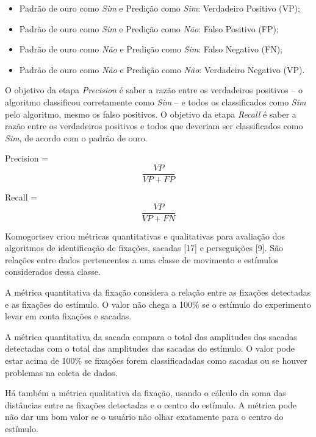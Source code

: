 \documentclass[brazil,]{report}
\begin{document}
\begin{itemize}
\itemsep1pt\parskip0pt
\item
  Padrão de ouro como \emph{Sim} e Predição como \emph{Sim}: Verdadeiro
  Positivo (VP);
\item
  Padrão de ouro como \emph{Sim} e Predição como \emph{Não}: Falso
  Positivo (FP);
\item
  Padrão de ouro como \emph{Não} e Predição como \emph{Sim}: Falso
  Negativo (FN);
\item
  Padrão de ouro como \emph{Não} e Predição como \emph{Não}: Verdadeiro
  Negativo (VP).
\end{itemize}

O objetivo da etapa \emph{Precision} é saber a razão entre os
verdadeiros positivos -- o algoritmo classificou corretamente como
\emph{Sim} -- e todos os classificados como \emph{Sim} pelo algoritmo,
mesmo os falso positivos. O objetivo da etapa \emph{Recall} é saber a
razão entre os verdadeiros positivos e todos que deveriam ser
classificados como \emph{Sim}, de acordo com o padrão de ouro.

Precision = \[\frac{VP}{VP+FP}\]

Recall = \[\frac{VP}{VP+FN}\]

Komogortsev criou métricas quantitativas e qualitativas para avaliação
dos algoritmos de identificação de fixações, sacadas {[}17{]} e
perseguições {[}9{]}. São relações entre dados pertencentes a uma classe
de movimento e estímulos considerados dessa classe.

A métrica quantitativa da fixação considera a relação entre as fixações
detectadas e as fixações do estímulo. O valor não chega a 100\% se o
estímulo do experimento levar em conta fixações e sacadas.

A métrica quantitativa da sacada compara o total das amplitudes das
sacadas detectadas com o total das amplitudes das sacadas do estímulo. O
valor pode estar acima de 100\% se fixações forem classificadadas como
sacadas ou se houver problemas na coleta de dados.

Há também a métrica qualitativa da fixação, usando o cálculo da soma das
distâncias entre as fixações detectadas e o centro do estímulo. A
métrica pode não dar um bom valor se o usuário não olhar exatamente para
o centro do estímulo.

\end{document}
